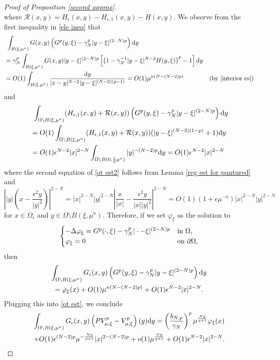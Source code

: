 \documentclass[reqno]{amsart}
\theoremstyle{remark}
\newcommand{\pa}{\partial}
\newcommand{\ep}{\epsilon}
\newcommand{\ga}{\gamma}
\newcommand{\mcr}{\mathcal{R}}
\newcommand{\dy}{\textup{d}y}
\newcommand{\mx}{{\mu,\xi}}
\renewcommand{\(}{\left(}
\renewcommand{\)}{\right)}
\numberwithin{equation}{section}
\begin{document}
\begin{proof}[Proof of Proposition \ref{second approx}]
\begin{equation}
\end{equation}
where $\mcr(x,y)=H_\ep(x,y)-H_{\ep,1}(x,y)-H(x,y)$. We observe from the first inequality in \eqref{ele ineq} that
\begin{align*}
&\ \int_{B(\xi,\mu^\kappa)} G(x,y) \(G^p(y,\xi)-\ga_N^p|y-\xi|^{(2-N)p}\) \dy\\
&=\ga_N^p\int_{B(\xi,\mu^\kappa)} G(x,y)|y-\xi|^{(2-N)p}\left[\(1-\ga_N^{-1}|y-\xi|^{N-2}H(y,\xi)\)^p-1\right] \dy\\
&=O(1)\int_{B(\xi,\mu^\kappa)} \frac{\dy}{|x-y|^{N-2}|y-\xi|^{(N-2)(p-1)}} = O(1)\mu^{\kappa(N-(N-2)p)} &( \textup{by } \eqref{interior es})
\end{align*}
and
\begin{equation}\label{ot est2}
\begin{aligned}
&\ \int_{\Omega\setminus B(\xi,\mu^\kappa)} (H_{\ep,1}(x,y)+\mcr(x,y))\(G^p(y,\xi)-\ga_N^p|y-\xi|^{(2-N)p}\)\dy\\
&=O(1)\int_{\Omega\setminus B(\xi,\mu^\kappa)} (H_{\ep,1}(x,y)+\mcr(x,y))(|y-\xi|^{(N-2)(1-p)}+1) \dy\\
&=O(1)\ep^{N-2}|x|^{2-N}\int_{\Omega\setminus B(0,\frac{1}{2}\mu^\kappa)} |y|^{-(N-2)p} \dy = O(1)\ep^{N-2}|x|^{2-N}
\end{aligned}
\end{equation}
where the second equation of \eqref{ot est2} follows from Lemma \ref{reg est for puntured} and
$$
\left||y|\(x-\frac{\ep^2y}{|y|^2}\)\right|^{2-N} = |x|^{2-N}|y|^{2-N}\left|\frac{x}{|x|}-\frac{\ep^2y}{|x||y|^2}\right|^{2-N} = O(1)(1+\ep \mu^{-\kappa})|x|^{2-N}|y|^{2-N}
$$
for $x \in \Omega_\ep$ and $y \in \Omega\setminus B(\xi,\mu^\kappa)$. Therefore, if we set $\varphi_\xi$ as the solution to
\begin{equation}\label{varphi}
\begin{cases}
-\Delta \varphi_\xi = G^p(\cdot,\xi)-\ga_N^p|\cdot-\xi|^{(2-N)p} &\textup{in } \Omega,\\
\varphi_\xi=0 &\textup{on } \pa \Omega,
\end{cases}
\end{equation}
then
\begin{multline}\label{g ep to varp}
\int_{\Omega\setminus B(\xi,\mu^\kappa)} G_\ep(x,y)\(G^p(y,\xi)-\ga_N^p|y-\xi|^{(2-N)p}\)\dy\\
=\varphi_\xi(x)+ O(1)\mu^{\kappa(N-(N-2)p)} +O(1)\ep^{N-2}|x|^{2-N}.
\end{multline}
Plugging this into \eqref{ot est}, we conclude
\begin{multline}\label{outer est}
\int_{\Omega\setminus B(\xi,\mu^\kappa)} G_\ep(x,y)\(PV_\mx^p-V_\mx^p\)(y)\dy =\(\frac{b_{N,p}}{\ga_N}\)^p\mu^{\frac{Np}{q+1}}\varphi_\xi(x) \\
+ O(1) \ep^{(N-2)p}\mu^{-\frac{Np}{p+1}}|x|^{2-(N-2)p} + o(1)\mu^{\frac{Np}{q+1}} + O(1)\ep^{N-2}|x|^{2-N}.
\end{multline}


\end{proof}
\end{document}
